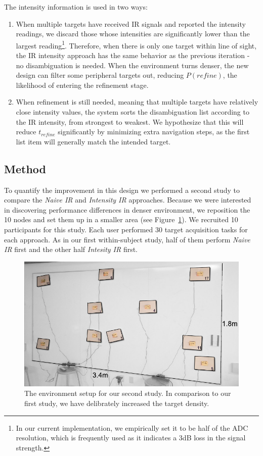 The intensity information is used in two ways:
\begin{enumerate}
\item When multiple targets have received IR signals and reported the intensity readings, we discard those whose intensities are significantly lower than the largest reading\footnote{In our current implementation, we empirically set it to be half of the ADC resolution, which is frequently used as it indicates a 3dB loss in the signal strength.}. Therefore, when there is only one target within line of sight, the IR intensity approach has the same behavior as the previous iteration - no disambiguation is needed. When the environment turns denser, the new design can filter some peripheral targets out, reducing $P(refine)$, the likelihood of entering the refinement stage.
\item When refinement is still needed, meaning that multiple targets have relatively close intensity values, the system sorts the disambiguation list according to the IR intensity, from strongest to weakest. We hypothesize that this will reduce $t_{refine}$ significantly by minimizing extra navigation steps, as the first list item will generally match the intended target.
\end{enumerate}

\subsection{Method}
To quantify the improvement in this design we performed a second study to compare the {\em Naive IR} and {\em Intensity IR} approaches. Because we were interested in discovering performance differences in denser environment, we reposition the 10 nodes and set them up in a smaller area (see Figure~\ref{fig:study-layout2}). We recruited 10 participants for this study. Each  user performed 30 target acquisition tasks for each approach. As in our first within-subject study, half of them perform {\em Naive IR} first and the other half {\em Intesity IR} first.

\begin{figure}[t]
\centering
\includegraphics[width=1.0\columnwidth]{figures/study-layout2.pdf}
\caption{The environment setup for our second study. In comparison to our first study, we have delibrately increased the target density.}
\label{fig:study-layout2}
\end{figure}


